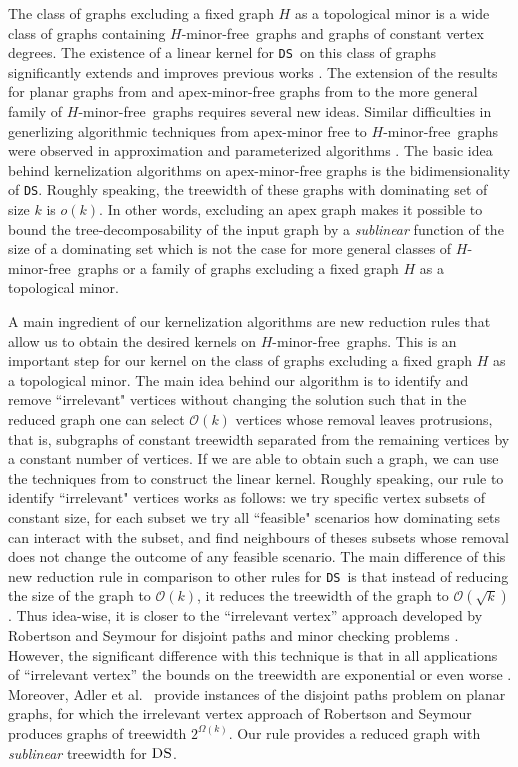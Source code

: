 \documentclass[11pt]{article}
\newcommand{\Hmf}{$H$-minor-free}
\newcommand{\tDS}{{\texttt{\sc DS}}}
\newcommand{\cO}{\mathcal{O}}
\begin{document}
  The class of graphs excluding a fixed graph $H$ as a topological minor  is a wide class of graphs containing \Hmf\, graphs and graphs of constant vertex degrees. The existence of a linear kernel for \tDS \, on this class of graphs significantly extends and improves  previous works  
  \cite{AG08TechReport,F.V.Fomin:2012,Gutner09}.
The extension of the results for planar graphs from \cite{AlberFN04} and apex-minor-free graphs from \cite{F.V.Fomin:2010oq} to the more general family of  \Hmf \, graphs requires several new ideas. Similar difficulties in 
  generlizing algorithmic techniques from apex-minor free to \Hmf \, graphs were observed in approximation   
\cite{Demaine:2009pd}  and parameterized algorithms  \cite{DemaineFHT05sub,DraganFG08}.  The basic idea behind kernelization algorithms on  apex-minor-free  graphs is the bidimensionality of \tDS. Roughly speaking, the treewidth of these graphs with dominating set of size $k$ is  $o(k)$.  In other words, 
excluding an apex graph 
makes it possible to bound the tree-decomposability  of the input 
graph by a {\em sublinear} function of the size of a dominating set which is not the case for more general classes of \Hmf \, graphs or a family of graphs excluding a fixed graph $H$ as a topological minor. 
  
  
A main ingredient of our kernelization algorithms are new reduction rules that allow us to obtain the desired kernels on \Hmf \, graphs.  This is an important step for our kernel on  the class of graphs excluding a fixed graph $H$ as a topological minor.   The main idea behind our algorithm is to identify and remove ``irrelevant" vertices  without changing the solution such that in the reduced graph one can select $\cO(k)$ vertices whose removal leaves protrusions, that is, subgraphs of constant treewidth separated from the remaining vertices by a constant number of vertices. If we are  able to 
obtain such a graph, we can use   the techniques from \cite{F.V.Fomin:2010oq} to construct the linear kernel. 
Roughly speaking, our rule to  identify  ``irrelevant"  vertices works as follows: 
we try specific vertex subsets of constant size, for each subset we try all ``feasible" scenarios how dominating sets can  interact with the subset, and find neighbours of theses 
subsets whose removal does not change the outcome of any feasible scenario. 
The main difference of this new reduction  rule in comparison to other rules for  \tDS \,   \cite{AlberFN04,ChenFKX07} is that instead of  reducing the size of the graph to $\cO(k)$, it reduces the treewidth of the graph to  $\cO(\sqrt{k})$. Thus idea-wise, it is closer  to 
 the ``irrelevant vertex'' approach  developed  by Robertson and Seymour  for 
  disjoint paths  and minor checking problems \cite{RobertsonS-XIII}. 
However, the significant difference with this technique is that in all applications of ``irrelevant vertex''   the bounds on the treewidth are exponential or even worse
\cite{KawarabayashiK08,Kawarabayashi:2010cs,Kobayashi:2009jt}. Moreover,  Adler et al.~\cite{Adler11} provide instances  of the  disjoint paths problem on planar graphs, for which the irrelevant vertex approach of  Robertson and Seymour produces graphs of treewidth $2^{\Omega(k)}$.  Our rule provides a reduced graph with   \emph{sublinear}    treewidth for $\tDS$.
\end{document}
